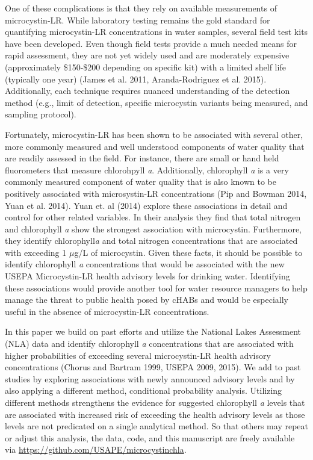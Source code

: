 \documentclass[11pt,]{article}
\begin{document}
One of these complications is that they rely on available measurements
of microcystin-LR. While laboratory testing remains the gold standard
for quantifying microcystin-LR concentrations in water samples, several
field test kits have been developed. Even though field tests provide a
much needed means for rapid assessment, they are not yet widely used and
are moderately expensive (approximately \$150-\$200 depending on
specific kit) with a limited shelf life (typically one year) (James et
al. 2011, Aranda-Rodriguez et al. 2015). Additionally, each technique
requires nuanced understanding of the detection method (e.g., limit of
detection, specific microcystin variants being measured, and sampling
protocol).

Fortunately, microcystin-LR has been shown to be associated with several
other, more commonly measured and well understood components of water
quality that are readily assessed in the field. For instance, there are
small or hand held fluorometers that measure chlorohpyll \emph{a}.
Additionally, chlorophyll \emph{a} is a very commonly measured component
of water quality that is also known to be positively associated with
microsystin-LR concentrations (Pip and Bowman 2014, Yuan et al. 2014).
Yuan et. al (2014) explore these associations in detail and control for
other related variables. In their analysis they find that total nitrogen
and chlorophyll \emph{a} show the strongest association with
microcystin. Furthermore, they identify chlorophyll\emph{a} and total
nitrogen concentrations that are associated with exceeding 1 \(\mu\)g/L
of microcystin. Given these facts, it should be possible to identify
chlorophyll \emph{a} concentrations that would be associated with the
new USEPA Microcystin-LR health advisory levels for drinking water.
Identifying these associations would provide another tool for water
resource managers to help manage the threat to public health posed by
cHABs and would be especially useful in the absence of microcystin-LR
concentrations.

In this paper we build on past efforts and utilize the National Lakes
Assessment (NLA) data and identify chlorophyll \emph{a} concentrations
that are associated with higher probabilities of exceeding several
microcystin-LR health advisory concentrations (Chorus and Bartram 1999,
USEPA 2009, 2015). We add to past studies by exploring associations with
newly announced advisory levels and by also applying a different method,
conditional probability analysis. Utilizing different methods
strengthens the evidence for suggested chlorophyll \emph{a} levels that
are associated with increased risk of exceeding the health advisory
levels as those levels are not predicated on a single analytical method.
So that others may repeat or adjust this analysis, the data, code, and
this manuscript are freely available via
\href{https://github.com/USAPE/microcystinchla}{\url{https://github.com/USAPE/microcystinchla}}.
\end{document}

